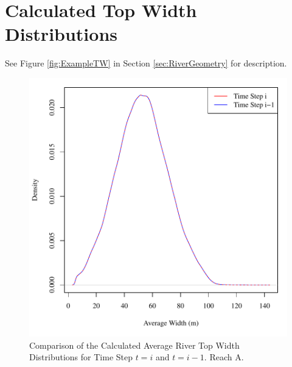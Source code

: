 \section{Calculated Top Width Distributions}
\label{App:Twdist}

\vspace{12pt}
See Figure \ref{fig:ExampleTW} in Section \ref{sec:RiverGeometry} for description.

\begin{figure}[htbp]
\begin{center}
	\includegraphics[width=6in]{"Figures/Results_USR/G widthToday A"}
	\caption{Comparison of the Calculated Average River Top Width Distributions for Time Step $t=i$ and $t=i-1$.  Reach A.}
\end{center}
\end{figure}

